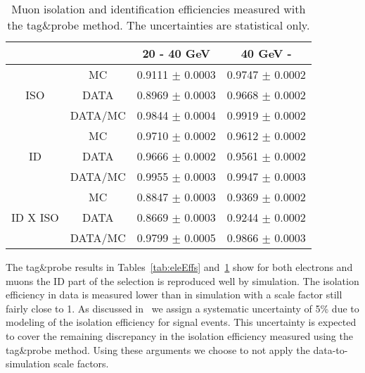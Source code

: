 \begin{table}[h]
\begin{center}
\begin{tabular}{c|c|cc}
\hline\hline
& & 20 - 40 GeV & 40 GeV -  \\ 
\hline
				& MC			& 	0.9111 $\pm$ 0.0003& 	0.9747 $\pm$ 0.0002 \\
ISO				& DATA			& 	0.8969 $\pm$ 0.0003& 	0.9668 $\pm$ 0.0002 \\
				& DATA/MC		& 	0.9844 $\pm$ 0.0004& 	0.9919 $\pm$ 0.0002 \\
\hline
				& MC			& 	0.9710 $\pm$ 0.0002& 	0.9612 $\pm$ 0.0002 \\
ID				& DATA			& 	0.9666 $\pm$ 0.0002& 	0.9561 $\pm$ 0.0002 \\
				& DATA/MC		& 	0.9955 $\pm$ 0.0003& 	0.9947 $\pm$ 0.0003 \\
\hline
				& MC			& 	0.8847 $\pm$ 0.0003& 	0.9369 $\pm$ 0.0002 \\
ID X ISO		& DATA			& 	0.8669 $\pm$ 0.0003& 	0.9244 $\pm$ 0.0002 \\
				& DATA/MC		& 	0.9799 $\pm$ 0.0005& 	0.9866 $\pm$ 0.0003 \\
\hline \hline
\end{tabular}
\caption{\label{tab:muEffs}Muon isolation and identification efficiencies measured with the tag\&probe method.
The uncertainties are statistical only.}
\end{center}
\end{table}

The tag\&probe results in Tables~\ref{tab:eleEffs} and~\ref{tab:muEffs} show for both electrons
and muons the ID part of the selection is reproduced well by simulation.
The isolation efficiency in data is measured lower than in simulation with a scale factor still fairly close to 1.
As discussed in~\cite{ssnote2011} we assign a systematic uncertainty of 5\% 
due to modeling of the isolation efficiency for signal events.
This uncertainty is expected to cover the remaining discrepancy in the isolation efficiency measured
using the tag\&probe method.
Using these arguments we choose to not apply the data-to-simulation scale factors.

